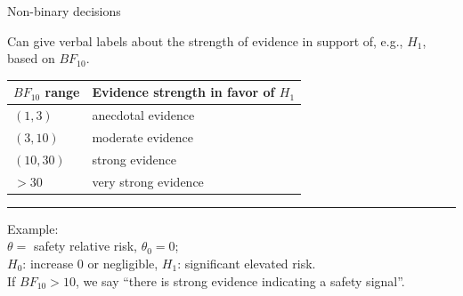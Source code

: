 \documentclass[11pt
,fragile=singleslide
,xcolor=dvipsnames
]{beamer}
\begin{document}
\begin{frame}{Non-binary decisions}
	
	Can give verbal labels about the \textcolor{Cerulean}{strength of evidence} in support of, e.g., $H_1$, based on  $BF_{10}$.  \cite{jeffreys1998theory,kass1995bayes,schonbrodt2017sequential}
	
	 \begin{table}
	 	\centering
	 	\begin{tabular}{ll}
	 		\toprule
	 		$BF_{10}$ range & Evidence strength in favor of $H_1$ \\
	 		\midrule
	 		$(1, 3)$ &  \textcolor{Cerulean}{anecdotal} evidence \\
	 		$(3, 10)$ &  \textcolor{Cerulean}{moderate} evidence \\
	 		$(10, 30)$ &  \textcolor{Cerulean}{strong} evidence \\
	 		$> 30$ &  \textcolor{Cerulean}{very strong} evidence\\
	 		\bottomrule
	 	\end{tabular}
	 	
	 \end{table}
	 
	

	\vfill
\rule{0.6\textwidth}{0.4pt}

\footnotesize{
	Example:\\
	$\theta =$ safety relative risk, $\theta_0 = 0$; \\
	$H_0$: increase 0 or negligible, $H_1$: significant elevated risk.\\
	If $BF_{10} > 10$, we say ``there is strong evidence indicating a safety signal''.
}
	
\end{frame}
\end{document}
